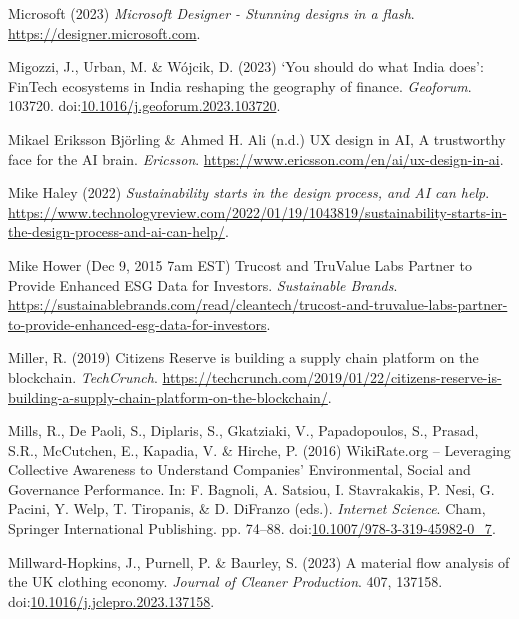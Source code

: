 \documentclass[
  letterpaper,
  DIV=11,
  numbers=noendperiod]{scrartcl}
\newlength{\cslhangindent}
\newenvironment{CSLReferences}[2] %
 {\begin{list}{}{%
  \setlength{\itemindent}{0pt}
  \setlength{\leftmargin}{0pt}
  \setlength{\parsep}{0pt}
  \ifodd #1
   \setlength{\leftmargin}{\cslhangindent}
   \setlength{\itemindent}{-1\cslhangindent}
  \fi
  \setlength{\itemsep}{#2\baselineskip}}}
 {\end{list}}
\begin{document}
\begin{CSLReferences}{0}{1}
Microsoft (2023) \emph{Microsoft {Designer} - {Stunning} designs in a
flash}. \url{https://designer.microsoft.com}.

Migozzi, J., Urban, M. \& Wójcik, D. (2023) {`{You} should do what
{India} does'}: {FinTech} ecosystems in {India} reshaping the geography
of finance. \emph{Geoforum}. 103720.
doi:\href{https://doi.org/10.1016/j.geoforum.2023.103720}{10.1016/j.geoforum.2023.103720}.

Mikael Eriksson Björling \& Ahmed H. Ali (n.d.) {UX} design in {AI}, {A}
trustworthy face for the {AI} brain. \emph{Ericsson}.
\url{https://www.ericsson.com/en/ai/ux-design-in-ai}.

Mike Haley (2022) \emph{Sustainability starts in the design process, and
{AI} can help}.
\url{https://www.technologyreview.com/2022/01/19/1043819/sustainability-starts-in-the-design-process-and-ai-can-help/}.

Mike Hower (Dec 9, 2015 7am EST) Trucost and {TruValue Labs Partner} to
{Provide Enhanced ESG Data} for {Investors}. \emph{Sustainable Brands}.
\url{https://sustainablebrands.com/read/cleantech/trucost-and-truvalue-labs-partner-to-provide-enhanced-esg-data-for-investors}.

Miller, R. (2019) Citizens {Reserve} is building a supply chain platform
on the blockchain. \emph{TechCrunch}.
\url{https://techcrunch.com/2019/01/22/citizens-reserve-is-building-a-supply-chain-platform-on-the-blockchain/}.

Mills, R., De Paoli, S., Diplaris, S., Gkatziaki, V., Papadopoulos, S.,
Prasad, S.R., McCutchen, E., Kapadia, V. \& Hirche, P. (2016)
{WikiRate}.org -- {Leveraging Collective Awareness} to {Understand
Companies}' {Environmental}, {Social} and {Governance Performance}. In:
F. Bagnoli, A. Satsiou, I. Stavrakakis, P. Nesi, G. Pacini, Y. Welp, T.
Tiropanis, \& D. DiFranzo (eds.). \emph{Internet {Science}}. Cham,
Springer International Publishing. pp. 74--88.
doi:\href{https://doi.org/10.1007/978-3-319-45982-0_7}{10.1007/978-3-319-45982-0\_7}.

Millward-Hopkins, J., Purnell, P. \& Baurley, S. (2023) A material flow
analysis of the {UK} clothing economy. \emph{Journal of Cleaner
Production}. 407, 137158.
doi:\href{https://doi.org/10.1016/j.jclepro.2023.137158}{10.1016/j.jclepro.2023.137158}.


\end{CSLReferences}
\end{document}
